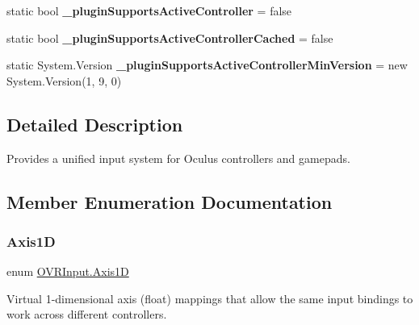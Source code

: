 \begin{DoxyCompactItemize}
static bool {\bfseries \+\_\+plugin\+Supports\+Active\+Controller} = false
\item 
\mbox{\label{class_o_v_r_input_ae0f47ad473f8165bafeda30e9a2b55e6}} 
static bool {\bfseries \+\_\+plugin\+Supports\+Active\+Controller\+Cached} = false
\item 
\mbox{\label{class_o_v_r_input_a817b890e23a8b7d40183a6c7936ba44e}} 
static System.\+Version {\bfseries \+\_\+plugin\+Supports\+Active\+Controller\+Min\+Version} = new System.\+Version(1, 9, 0)
\end{DoxyCompactItemize}


\subsection{Detailed Description}
Provides a unified input system for Oculus controllers and gamepads. 



\subsection{Member Enumeration Documentation}
\mbox{\label{class_o_v_r_input_af5c3e63489ca9ee2e5db3a657f7f27f6}} 
\subsubsection{\texorpdfstring{Axis1D}{Axis1D}}
{\footnotesize\ttfamily enum \mbox{\hyperlink{class_o_v_r_input_af5c3e63489ca9ee2e5db3a657f7f27f6}{O\+V\+R\+Input.\+Axis1D}}\hspace{0.3cm}{\ttfamily [strong]}}



Virtual 1-\/dimensional axis (float) mappings that allow the same input bindings to work across different controllers. 

